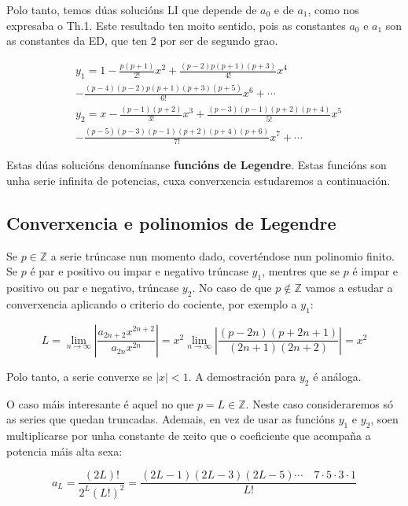 \documentclass[a4paper,12pt,titlepage]{article}
\begin{document}
Polo tanto, temos dúas solucións LI que depende de $a_0$ e de $a_1$, como nos expresaba o Th.1. Este resultado ten moito sentido, pois as constantes $a_0$ e $a_1$ son as constantes da ED, que ten 2 por ser de segundo grao.

\begin{equation*}
\begin{aligned}
& y_{1}=1-\frac{p(p+1)}{2 !} x^{2}+\frac{(p-2) p(p+1)(p+3)}{4 !} x^{4} \\
& -\frac{(p-4)(p-2) p(p+1)(p+3)(p+5)}{6 !} x^{6}+\cdots \\
& y_{2}=x-\frac{(p-1)(p+2)}{3 !} x^{3}+\frac{(p-3)(p-1)(p+2)(p+4)}{5 !} x^{5} \\
& -\frac{(p-5)(p-3)(p-1)(p+2)(p+4)(p+6)}{7 !} x^{7}+\cdots
\end{aligned}
\end{equation*}

Estas dúas solucións denomínanse \textbf{funcións de Legendre}. Estas funcións son unha serie infinita de potencias, cuxa converxencia estudaremos a continuación.

\subsection{Converxencia e polinomios de Legendre}

Se $p\in \mathbb{Z}$ a serie trúncase nun momento dado, coverténdose nun polinomio finito. Se $p$ é par e positivo ou impar e negativo trúncase $y_1$, mentres que se $p$ é impar e positivo ou par e negativo, trúncase $y_2$. No caso de que $p\notin \mathbb{Z}$ vamos a estudar a converxencia aplicando o criterio do cociente, por exemplo a $y_1$:

$$
L=\lim _{n \rightarrow \infty}\left|\frac{a_{2 n+2} x^{2 n+2}}{a_{2 n} x^{2 n}}\right|=x^{2} \lim _{n \rightarrow \infty}\left|\frac{(p-2 n)(p+2 n+1)}{(2 n+1)(2 n+2)}\right|=x^{2}
$$

Polo tanto, a serie converxe se $|x|<1$. A demostración para $y_2$ é análoga.

\par O caso máis interesante é aquel no que $p=L\in \mathbb{Z}$. Neste caso consideraremos só as series que quedan truncadas. Ademais, en vez de usar as funcións $y_1$ e $y_2$, soen multiplicarse por unha constante de xeito que o coeficiente que acompaña a potencia máis alta sexa:

\begin{equation*}
    a_L = \frac{(2 L) !}{2^{L}(L !)^{2}}=\frac{(2 L-1)(2 L-3)(2 L-5) \cdots \quad 7 \cdot 5 \cdot 3 \cdot 1}{L !}
\end{equation*}
\end{document}
